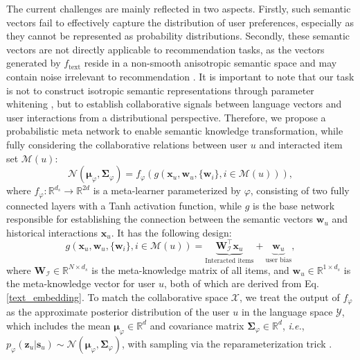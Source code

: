 \documentclass[sigconf]{acmart}
\begin{document}
The current challenges are mainly reflected in two aspects. Firstly, such semantic vectors fail to effectively capture the distribution of user preferences, especially as they cannot be represented as probability distributions. Secondly, these semantic vectors are not directly applicable to recommendation tasks, as the vectors generated by $f_\text{text}$ reside in a non-smooth anisotropic semantic space \cite{zhang2022effect} and may contain noise irrelevant to recommendation \cite{ren2024representation, sheng2024language}. It is important to note that our task is not to construct isotropic semantic representations through parameter whitening \cite{ermolov2021whitening}, but to establish collaborative signals \cite{he2020lightgcn} between language vectors and user interactions from a distributional perspective. Therefore, we propose a probabilistic meta network to enable semantic knowledge transformation, while fully considering the collaborative relations between user $u$ and interacted item set $\mathcal M(u)$:
\begin{equation}
\label{language_p}
\mathcal N(\boldsymbol{\mu}_{\varphi}, \boldsymbol{\Sigma}_{\varphi}) = f_\varphi \left (g(\mathbf x_u, \mathbf w_u, \{\mathbf w_i\}, i \in \mathcal M(u))\right ),
\end{equation}
where $f_\varphi: \mathbb{R}^{d_s} \to \mathbb{R}^{2d}$ is a meta-learner parameterized by 
$\varphi$, consisting of two fully connected layers with a Tanh activation function, while $g$ is the base network responsible for establishing the connection between the semantic vectors $\mathbf w_u$ and historical interactions $\mathbf x_u$. It has the following design:
\begin{equation}
\label{meta_network}
g(\mathbf x_u, \mathbf w_u, \{\mathbf w_i\}, i \in \mathcal M(u))=\underbrace{\mathbf W_{\mathcal I}^\top \mathbf x_u}_{\text{
Interacted items} }  + \underbrace{\mathbf w_u}_{\text{user bias} },
\end{equation}
where $\mathbf W_{\mathcal I} \in \mathbb R^{N \times d_s}$ is the meta-knowledge matrix of all items, and $\mathbf w_{u} \in \mathbb R^{1 \times d_s}$ is the meta-knowledge vector for user $u$, both of which are derived from Eq. \ref{text_embedding}. To match the collaborative space $\mathcal X$, we treat the output of $f_{\varphi}$ as the approximate posterior distribution of the user $u$ in the language space $\mathcal Y$, which includes the mean $\boldsymbol{\mu}_{\varphi}\in \mathbb R^{d}$ and covariance matrix $\boldsymbol{\Sigma}_{\varphi}\in \mathbb R^{d}$, \textit{i.e.}, $p_{\varphi}(\mathbf z_u|\mathbf s_u) \sim \mathcal N(\boldsymbol{\mu}_{\varphi}, \boldsymbol{\Sigma}_{\varphi})$, with sampling via the reparameterization trick \cite{kingma2013auto, luo2022understanding}.
\end{document}
